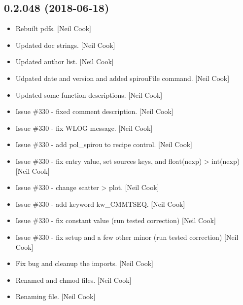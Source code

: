 \documentclass[a4paper,10pt,english]{report}
\begin{document}
\subsection{0.2.048 (2018-06-18)}
\label{\detokenize{misc/changelog:id416}}\begin{itemize}
\item {} 
Rebuilt pdfs. {[}Neil Cook{]}

\item {} 
Updated doc strings. {[}Neil Cook{]}

\item {} 
Updated author list. {[}Neil Cook{]}

\item {} 
Udpated date and version and added spirouFile command. {[}Neil Cook{]}

\item {} 
Updated some function descriptions. {[}Neil Cook{]}

\item {} 
Issue \#330 - fixed comment description. {[}Neil Cook{]}

\item {} 
Issue \#330 - fix WLOG message. {[}Neil Cook{]}

\item {} 
Issue \#330 - add pol\_spirou to recipe control. {[}Neil Cook{]}

\item {} 
Issue \#330 - fix entry value, set sources keys, and float(nexp) \textendash{}\textgreater{}
int(nexp) {[}Neil Cook{]}

\item {} 
Issue \#330 - change scatter \textendash{}\textgreater{} plot. {[}Neil Cook{]}

\item {} 
Issue \#330 - add keyword kw\_CMMTSEQ. {[}Neil Cook{]}

\item {} 
Issue \#330 - fix constant value (run tested correction) {[}Neil Cook{]}

\item {} 
Issue \#330 - fix setup and a few other minor (run tested correction)
{[}Neil Cook{]}

\item {} 
Fix bug and cleanup the imports. {[}Neil Cook{]}

\item {} 
Renamed and chmod files. {[}Neil Cook{]}

\item {} 
Renaming file. {[}Neil Cook{]}


\end{itemize}
\end{document}
